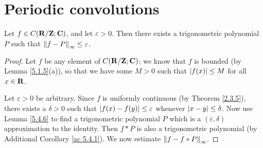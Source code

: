 \section{Periodic convolutions}\label{sec 5.4}

\begin{theorem}\label{5.4.1}
    Let \(f \in C(\R / \Z ; \C)\), and let \(\varepsilon > 0\).
    Then there exists a trigonometric polynomial \(P\) such that \(\norm*{f - P}_{\infty} \leq \varepsilon\).
\end{theorem}

\begin{proof}
    Let \(f\) be any element of \(C(\R / \Z ; \C)\);
    we know that \(f\) is bounded (by Lemma \ref{5.1.5}(a)), so that we have some \(M > 0\) such that \(\abs{f(x)} \leq M\) for all \(x \in \R\).

    Let \(\varepsilon > 0\) be arbitrary.
    Since \(f\) is uniformly continuous (by Theorem \ref{2.3.5}), there exists a \(\delta > 0\) such that \(\abs{f(x) - f(y)} \leq \varepsilon\) whenever \(\abs{x - y} \leq \delta\).
    Now use Lemma \ref{5.4.6} to find a trigonometric polynomial \(P\) which is a \((\varepsilon, \delta)\) approximation to the identity.
    Then \(f * P\) is also a trigonometric polynomial (by Additional Corollary \ref{ac 5.4.1}).
    We now estimate \(\norm*{f - f * P}_{\infty}\).


\end{proof}
